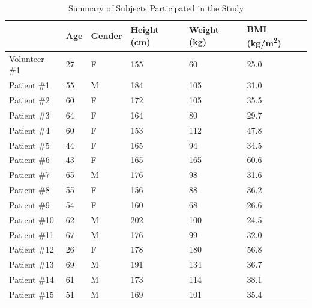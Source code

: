 \documentclass[journal,twoside,web]{ieeecolor}
\begin{document}
\begin{table}
	\caption{Summary of Subjects Participated in the Study}
	\label{TAB:Subject}
	\setlength{\tabcolsep}{3pt}
	\begin{tabular}{m{} m{} m{} m{} m{} m{}}
		\toprule
		& Age & Gender & Height (\si{\centi\meter}) & Weight (\si{\kilogram}) & BMI (\si{\kilogram/\square\meter}) \\
		\hline
		Volunteer \#1 & 27 & F & 155 &  60 & 25.0 \\
		Patient \#1   & 55 & M & 184 & 105 & 31.0 \\ %
		Patient \#2   & 60 & F & 172 & 105 & 35.5 \\ %
		Patient \#3   & 64 & F & 164 &  80 & 29.7 \\ %
		Patient \#4   & 60 & F & 153 & 112 & 47.8 \\ %
		Patient \#5   & 44 & F & 165 &  94 & 34.5 \\ %
		Patient \#6   & 43 & F & 165 & 165 & 60.6 \\ %
		Patient \#7   & 65 & M & 176 &  98 & 31.6 \\ %
		Patient \#8   & 55 & F & 156 &  88 & 36.2 \\ %
		Patient \#9   & 54 & F & 160 &  68 & 26.6 \\ %
		
		Patient \#10  & 62 & M & 202 & 100 & 24.5 \\ %
		Patient \#11  & 67 & M & 176 &  99 & 32.0 \\ %
		Patient \#12  & 26 & F & 178 & 180 & 56.8 \\ %
		Patient \#13  & 69 & M & 191 & 134 & 36.7 \\ %
		Patient \#14  & 61 & M & 173 & 114 & 38.1 \\ %
		Patient \#15  & 51 & M & 169 & 101 & 35.4 \\ %
		\bottomrule
	\end{tabular}
\end{table}
\end{document}
